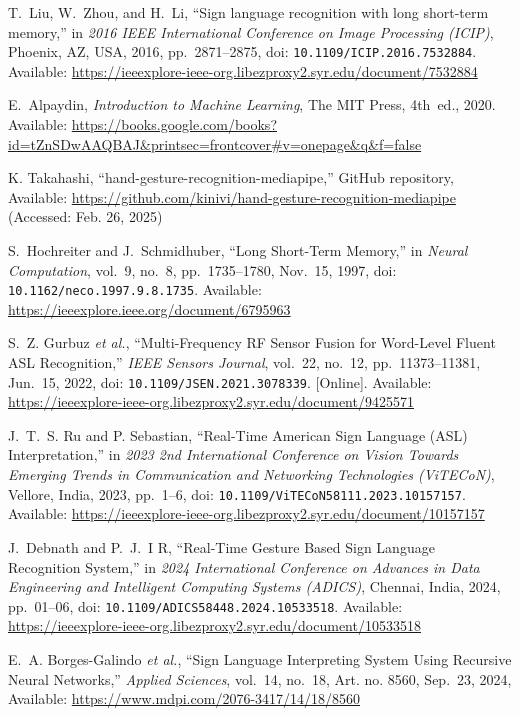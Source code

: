 \documentclass[12pt]{article}
\begin{document}
\begin{thebibliography}{99}
T.~Liu, W.~Zhou, and H.~Li, 
“Sign language recognition with long short-term memory,” 
in \emph{2016 IEEE International Conference on Image Processing (ICIP)}, 
Phoenix, AZ, USA, 2016, pp.~2871--2875, 
doi: \texttt{10.1109/ICIP.2016.7532884}.  
Available: \url{https://ieeexplore-ieee-org.libezproxy2.syr.edu/document/7532884}

E.~Alpaydin, 
\emph{Introduction to Machine Learning}, 
The MIT Press, 4th~ed., 2020.  
Available: \url{https://books.google.com/books?id=tZnSDwAAQBAJ&printsec=frontcover#v=onepage&q&f=false}

K. Takahashi, “hand-gesture-recognition-mediapipe,” GitHub repository,  
Available: \url{https://github.com/kinivi/hand-gesture-recognition-mediapipe} (Accessed: Feb. 26, 2025)

S.~Hochreiter and J.~Schmidhuber, 
“Long Short-Term Memory,” 
in \emph{Neural Computation}, vol.~9, no.~8, pp.~1735--1780, Nov.~15, 1997, 
doi: \texttt{10.1162/neco.1997.9.8.1735}. 
Available: \url{https://ieeexplore.ieee.org/document/6795963}

S.~Z. Gurbuz \emph{et al.}, 
“Multi-Frequency RF Sensor Fusion for Word-Level Fluent ASL Recognition,” 
\emph{IEEE Sensors Journal}, vol.~22, no.~12, pp.~11373--11381, Jun.~15, 2022, 
doi: \texttt{10.1109/JSEN.2021.3078339}. [Online].  
Available: \url{https://ieeexplore-ieee-org.libezproxy2.syr.edu/document/9425571}

J.~T.~S. Ru and P. Sebastian, 
“Real-Time American Sign Language (ASL) Interpretation,” 
in \emph{2023 2nd International Conference on Vision Towards Emerging Trends in Communication and Networking Technologies (ViTECoN)}, 
Vellore, India, 2023, pp.~1--6, 
doi: \texttt{10.1109/ViTECoN58111.2023.10157157}. 
Available: \url{https://ieeexplore-ieee-org.libezproxy2.syr.edu/document/10157157}

J.~Debnath and P.~J.~I R, 
“Real-Time Gesture Based Sign Language Recognition System,” 
in \emph{2024 International Conference on Advances in Data Engineering and Intelligent Computing Systems (ADICS)}, 
Chennai, India, 2024, pp.~01--06, 
doi: \texttt{10.1109/ADICS58448.2024.10533518}.
Available: \url{https://ieeexplore-ieee-org.libezproxy2.syr.edu/document/10533518}

E.~A. Borges-Galindo \emph{et al.}, 
“Sign Language Interpreting System Using Recursive Neural Networks,” 
\emph{Applied Sciences}, vol.~14, no.~18, Art. no. 8560, Sep.~23, 2024,  
Available: \url{https://www.mdpi.com/2076-3417/14/18/8560}


\end{thebibliography}
\end{document}
